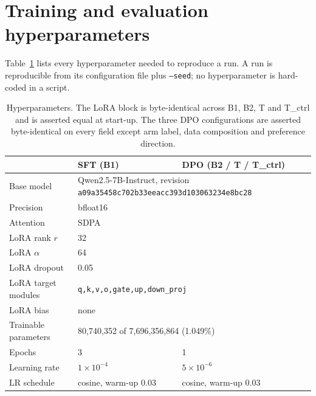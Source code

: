 
\section{Training and evaluation hyperparameters}
\label{app:hparams}

Table~\ref{tab:hparams} lists every hyperparameter needed to reproduce a run. A run is
reproducible from its configuration file plus \texttt{--seed}; no hyperparameter is
hard-coded in a script.

\begin{table}[h]
\centering
\caption{Hyperparameters. The LoRA block is byte-identical across B1, B2, T and
T\_ctrl and is asserted equal at start-up. The three DPO configurations are asserted
byte-identical on every field except arm label, data composition and preference
direction.}
\label{tab:hparams}
\small
\begin{tabular}{lll}
\toprule
& SFT (B1) & DPO (B2 / T / T\_ctrl) \\
\midrule
Base model            & \multicolumn{2}{l}{Qwen2.5-7B-Instruct, revision \texttt{a09a35458c702b33eeacc393d103063234e8bc28}} \\
Precision             & \multicolumn{2}{l}{bfloat16} \\
Attention             & \multicolumn{2}{l}{SDPA} \\
LoRA rank $r$         & \multicolumn{2}{l}{32} \\
LoRA $\alpha$         & \multicolumn{2}{l}{64} \\
LoRA dropout          & \multicolumn{2}{l}{0.05} \\
LoRA target modules   & \multicolumn{2}{l}{\texttt{q,k,v,o,gate,up,down\_proj}} \\
LoRA bias             & \multicolumn{2}{l}{none} \\
Trainable parameters  & \multicolumn{2}{l}{80{,}740{,}352 of 7{,}696{,}356{,}864 (1.049\%)} \\
\midrule
Epochs                & 3                       & 1 \\
Learning rate         & $1\times10^{-4}$        & $5\times10^{-6}$ \\
LR schedule           & cosine, warm-up 0.03    & cosine, warm-up 0.03 \\

\end{tabular}
\end{table}
